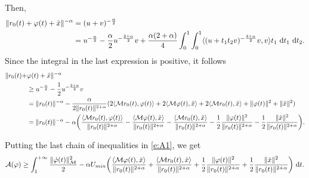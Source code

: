 \documentclass[a4paper,10pt]{amsart}
\newcommand{\ud}{\mathrm{d}}
\theoremstyle{plain}
\theoremstyle{definition}
\numberwithin{equation}{section}
\numberwithin{thm}{section}
\begin{document}
Then,
\begin{equation*}
    \begin{aligned}
        \|r_0(t)+\varphi(t)+\Tilde{x}\|^{-\alpha} & = (u+v)^{-\frac{\alpha}{2}}
        \\
        &= u^{-\frac{\alpha}{2}} -\frac{\alpha}{2}u^{-\frac{2+\alpha}{2}}v + \frac{\alpha(2+\alpha)}{4}\int_{0}^{1}\int_{0}^{1}\langle(u+t_1 t_2 v)^{-\frac{4+\alpha}{2}}v,v\rangle t_1\ \ud t_1\ \ud t_2.
    \end{aligned}
\end{equation*}
Since the integral in the last expression is positive, it follows
\[
    \begin{split}
    \|r_0(t)+&\varphi(t)+\Tilde{x}\|^{-\alpha} 
    \\
    &\geq u^{-\frac{\alpha}{2}} -\frac{1}{2}u^{-\frac{2+\alpha}{2}}v \\
    &= \|r_0(t)\|^{-\alpha} -\frac{\alpha}{2\|r_0(t)\|^{2+\alpha}}(2\langle \mathcal{M}r_0(t),\varphi(t)\rangle + 2\langle \mathcal{M}\varphi(t),\Tilde{x}\rangle + 2\langle \mathcal{M} r_0(t),\Tilde{x}\rangle + \|\varphi(t)\|^2 + \|\Tilde{x}\|^2)\\
    & = \|r_0(t)\|^{-\alpha} -\alpha\bigg(\frac{\langle \mathcal{M}r_0(t),\varphi(t)\rangle}{\|r_0(t)\|^{2+\alpha}} - \frac{\langle \mathcal{M}\varphi(t),\Tilde{x}\rangle}{\|r_0(t)\|^{2+\alpha}} - \frac{\langle \mathcal{M} r_0(t),\Tilde{x}\rangle}{\|r_0(t)\|^{2+\alpha}} -\frac{1}{2}\frac{\|\varphi(t)\|^2}{\|r_0(t)\|^{2+\alpha}} - \frac{1}{2}\frac{\|\Tilde{x}\|^2}{\|r_0(t)\|^{2+\alpha}}\bigg).
    \end{split}    
\]

Putting the last chain of inequalities in \eqref{e:A1}, we get
\begin{equation}
\label{e:AA2}
\mathcal{A}(\varphi) \ge \int_{1}^{+\infty} \frac{\|\dot\varphi(t)\|_\mathcal{M}^2}{2} - \alpha U_{min}\bigg( \frac{\langle \mathcal{M}\varphi(t),\Tilde{x}\rangle}{\|r_0(t)\|^{2+\alpha}} + \frac{\langle \mathcal{M} r_0(t),\Tilde{x}\rangle}{\|r_0(t)\|^{2+\alpha}} +\frac{1}{2}\frac{\|\varphi(t)\|^2}{\|r_0(t)\|^{2+\alpha}} + \frac{1}{2}\frac{\|\Tilde{x}\|^2}{\|r_0(t)\|^{2+\alpha}}\bigg) \ \ud t.
\end{equation}
\end{document}
